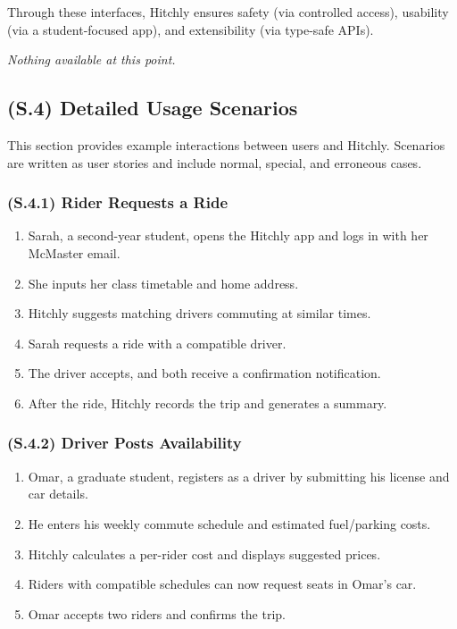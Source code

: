 \documentclass[12pt,letterpaper]{article}
\begin{document}
Through these interfaces, Hitchly ensures safety (via controlled access), usability (via a student-focused app), and extensibility (via type-safe APIs).

\textit{Nothing available at this point.}

\subsection{(S.4) Detailed Usage Scenarios} %

This section provides example interactions between users and Hitchly. Scenarios are written as user stories and include normal, special, and erroneous cases.

\subsubsection{(S.4.1) Rider Requests a Ride} %
\begin{enumerate}
    \item Sarah, a second-year student, opens the Hitchly app and logs in with her McMaster email.
    \item She inputs her class timetable and home address.
    \item Hitchly suggests matching drivers commuting at similar times.
    \item Sarah requests a ride with a compatible driver.
    \item The driver accepts, and both receive a confirmation notification.
    \item After the ride, Hitchly records the trip and generates a summary.
\end{enumerate}

\subsubsection{(S.4.2) Driver Posts Availability} %
\begin{enumerate}
    \item Omar, a graduate student, registers as a driver by submitting his license and car details.
    \item He enters his weekly commute schedule and estimated fuel/parking costs.
    \item Hitchly calculates a per-rider cost and displays suggested prices.
    \item Riders with compatible schedules can now request seats in Omar’s car.
    \item Omar accepts two riders and confirms the trip.
\end{enumerate}
\end{document}
